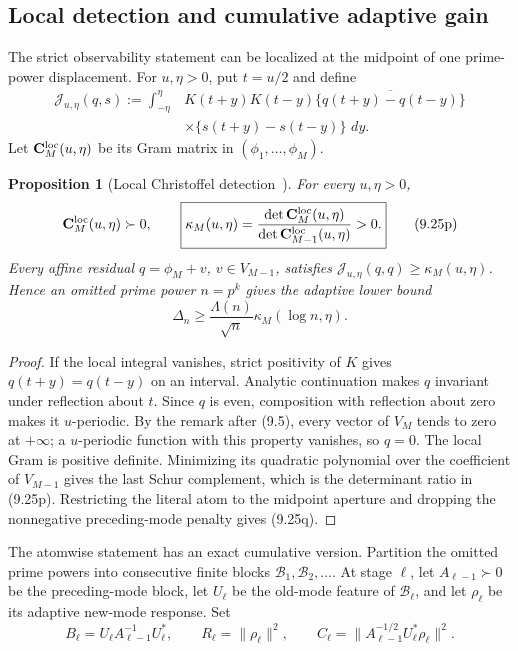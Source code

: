 \documentclass[11pt]{amsart}
\newtheorem{proposition}[theorem]{Proposition}
\theoremstyle{definition}
\theoremstyle{remark}
\newcommand{\dd}{\,d}
\begin{document}
\subsection{Local detection and cumulative adaptive gain}

The strict observability statement can be localized at the midpoint of
one prime-power displacement.  For \(u,\eta>0\), put \(t=u/2\) and
define
\[
\begin{aligned}
 \mathcal J_{u,\eta}(q,s)
 :=\int_{-\eta}^{\eta}&K(t+y)K(t-y)
 \overline{\{q(t+y)-q(t-y)\}}\\
 &\times\{s(t+y)-s(t-y)\}\,\dd y .
\end{aligned}
\tag{9.25o}
\]
Let \(\mathbf C_M^{\rm loc}(u,\eta)\) be its Gram matrix in
\((\phi_1,\ldots,\phi_M)\).

\begin{proposition}[Local Christoffel detection~\cite{Bhatia1997}]
\label{prop:local-christoffel}
For every \(u,\eta>0\),
\[
 \mathbf C_M^{\rm loc}(u,\eta)\succ0,
 \qquad
 \boxed{\kappa_M(u,\eta)
 =\frac{\det\mathbf C_M^{\rm loc}(u,\eta)}
        {\det\mathbf C_{M-1}^{\rm loc}(u,\eta)}>0.}
\tag{9.25p}
\]
Every affine residual \(q=\phi_M+v\), \(v\in V_{M-1}\), satisfies
\(\mathcal J_{u,\eta}(q,q)\ge\kappa_M(u,\eta)\).  Hence an omitted
prime power \(n=p^k\) gives the adaptive lower bound
\[
 \Delta_n\ge\frac{\Lambda(n)}{\sqrt n}
 \kappa_M(\log n,\eta).
\tag{9.25q}
\]
\end{proposition}

\begin{proof}
If the local integral vanishes, strict positivity of \(K\) gives
\(q(t+y)=q(t-y)\) on an interval.  Analytic continuation makes \(q\)
invariant under reflection about \(t\).  Since \(q\) is even, composition
with reflection about zero makes it \(u\)-periodic.  By the remark after
(9.5), every vector of \(V_M\) tends to zero at \(+\infty\); a
\(u\)-periodic function with this property vanishes, so \(q=0\).  The local Gram is positive definite.
Minimizing its quadratic polynomial over the coefficient of
\(V_{M-1}\) gives the last Schur complement, which is the determinant
ratio in (9.25p).  Restricting the literal atom to the midpoint aperture
and dropping the nonnegative preceding-mode penalty gives (9.25q).
\end{proof}

The atomwise statement has an exact cumulative version.  Partition the
omitted prime powers into consecutive finite blocks
\(\mathcal B_1,\mathcal B_2,\ldots\).  At stage \(\ell\), let
\(A_{\ell-1}\succ0\) be the preceding-mode block, let \(U_\ell\) be the
old-mode feature of \(\mathcal B_\ell\), and let \(\rho_\ell\) be its
adaptive new-mode response.  Set
\[
 B_\ell=U_\ell A_{\ell-1}^{-1}U_\ell^*,\qquad
 R_\ell=\|\rho_\ell\|^2,
 \qquad
 C_\ell=\|A_{\ell-1}^{-1/2}U_\ell^*\rho_\ell\|^2.
\tag{9.25r}
\]
\end{document}

